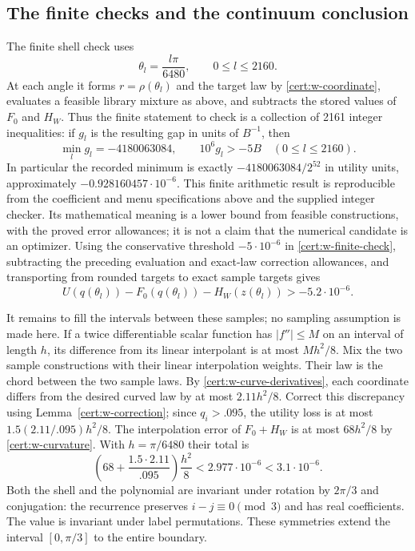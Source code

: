 \subsection{The finite checks and the continuum conclusion}

The finite shell check uses
\begin{equation}
 \theta_l=\frac{l\pi}{6480},\qquad 0\le l\le2160.
 \label{cert:w-samples}
\end{equation}
At each angle it forms $r=\rho(\theta_l)$ and the target law by
\eqref{cert:w-coordinate}, evaluates a feasible library mixture as
above, and subtracts the stored values of $F_0$ and $H_W$.  Thus the
finite statement to check is a collection of 2161 integer inequalities:
if $g_l$ is the resulting gap in units of $B^{-1}$, then
\begin{equation}
 \min_l g_l=-4180063084,
 \qquad 10^6 g_l>-5B\quad(0\le l\le2160).
 \label{cert:w-finite-check}
\end{equation}
In particular the recorded minimum is exactly
$-4180063084/2^{52}$ in utility units, approximately
$-0.928160457\cdot10^{-6}$.  This finite arithmetic result is
reproducible from the coefficient and menu specifications above and the
supplied integer checker.  Its mathematical meaning is a lower bound
from feasible constructions, with the proved error allowances; it is
not a claim that the numerical candidate is an optimizer.
Using the conservative threshold $-5\cdot10^{-6}$ in
\eqref{cert:w-finite-check}, subtracting the preceding evaluation and
exact-law correction allowances, and transporting from rounded targets
to exact sample targets gives
\begin{equation}
 U(q(\theta_l))-F_0(q(\theta_l))-H_W(z(\theta_l))
       >-5.2\cdot10^{-6}.
 \label{cert:w-sample-bound}
\end{equation}

It remains to fill the intervals between these samples; no sampling
assumption is made here.  If a twice differentiable scalar function
has $|f''|\le M$ on an interval of length $h$, its difference from its
linear interpolant is at most $Mh^2/8$.  Mix the two sample
constructions with their linear interpolation weights.  Their law is
the chord between the two sample laws.  By
\eqref{cert:w-curve-derivatives}, each coordinate differs from the
desired curved law by at most $2.11h^2/8$.  Correct this discrepancy
using Lemma~\ref{cert:w-correction}; since $q_i>.095$, the utility
loss is at most $1.5(2.11/.095)h^2/8$.  The interpolation error of
$F_0+H_W$ is at most $68h^2/8$ by \eqref{cert:w-curvature}.
With $h=\pi/6480$ their total is
\begin{equation}
 \left(68+\frac{1.5\cdot2.11}{.095}\right)\frac{h^2}{8}
 <2.977\cdot10^{-6}<3.1\cdot10^{-6}.
 \label{cert:w-interpolation}
\end{equation}
Both the shell and the polynomial are invariant under rotation by
$2\pi/3$ and conjugation: the recurrence preserves $i-j\equiv0\pmod3$
and has real coefficients.  The value is invariant under label
permutations.  These symmetries extend the interval $[0,\pi/3]$ to the
entire boundary.

